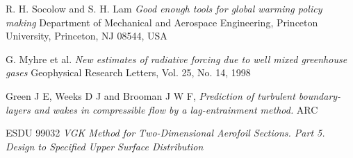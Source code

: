 \documentclass{article}
\begin{document}
\begin{thebibliography}{9}


    R. H. Socolow and S. H. Lam
    \emph{Good enough tools for global warming policy making}
    Department of Mechanical and Aerospace Engineering, Princeton University,
    Princeton, NJ 08544, USA

    G. Myhre et al.
    \emph{New estimates of radiative forcing due to well mixed greenhouse gases}
    Geophysical Research Letters, Vol. 25, No. 14, 1998

    Green J E, Weeks D J and Brooman J W F,
    \emph{Prediction of turbulent boundary-layers and wakes in compressible flow by a lag-entrainment method.}
    ARC

    ESDU 99032
    \emph{VGK Method for Two-Dimensional Aerofoil Sections. Part 5. Design to Specified Upper Surface Distribution}
  
\end{thebibliography}
\end{document}
